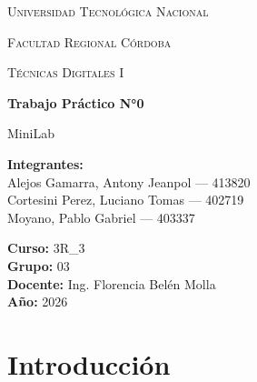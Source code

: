 \documentclass[12pt,a4paper]{article}
\begin{document}

\begin{titlepage}
    \centering

    {\scshape\LARGE Universidad Tecnológica Nacional \par}
    \vspace{0.3cm}
    {\scshape\Large Facultad Regional Córdoba \par}
    \vspace{1.5cm}

    {\scshape\Large Técnicas Digitales I \par}
    \vspace{2cm}

    {\Huge\bfseries Trabajo Práctico N°0 \par}
    \vspace{0.5cm}
    {\LARGE MiniLab \par}

    \vspace{2cm}

    \begin{flushleft}
    \textbf{Integrantes:} \\
    Alejos Gamarra, Antony Jeanpol --- 413820 \\
    Cortesini Perez, Luciano Tomas  --- 402719 \\
    Moyano, Pablo Gabriel  --- 403337 \\

    \vspace{0.5cm}

    \textbf{Curso:} 3R\_3 \\
    \textbf{Grupo:} 03 \\
    \textbf{Docente:} Ing. Florencia Belén Molla \\
    \textbf{Año:} 2026 \\
    \end{flushleft}

    \vfill

\end{titlepage}
\thispagestyle{empty}

\clearpage
{}

\vspace{1cm}

\tableofcontents
\newpage

\section{Introducción}
\end{document}
